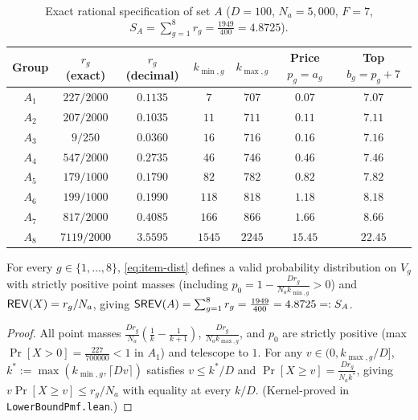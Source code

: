 \begin{table}[h]
\centering\small
\begin{tabular}{ccccccc}
\toprule
Group & $r_g$ (exact) & $r_g$ (decimal) & $k_{\min,g}$ & $k_{\max,g}$ & Price $p_g = a_g$ & Top $b_g = p_g + 7$ \\
\midrule
$A_1$ & $227/2000$  & $0.1135$ & $7$    & $707$  & $0.07$  & $7.07$  \\
$A_2$ & $207/2000$  & $0.1035$ & $11$   & $711$  & $0.11$  & $7.11$  \\
$A_3$ & $9/250$     & $0.0360$ & $16$   & $716$  & $0.16$  & $7.16$  \\
$A_4$ & $547/2000$  & $0.2735$ & $46$   & $746$  & $0.46$  & $7.46$  \\
$A_5$ & $179/1000$  & $0.1790$ & $82$   & $782$  & $0.82$  & $7.82$  \\
$A_6$ & $199/1000$  & $0.1990$ & $118$  & $818$  & $1.18$  & $8.18$  \\
$A_7$ & $817/2000$  & $0.4085$ & $166$  & $866$  & $1.66$  & $8.66$  \\
$A_8$ & $7119/2000$ & $3.5595$ & $1545$ & $2245$ & $15.45$ & $22.45$ \\
\bottomrule
\end{tabular}
\caption{Exact rational specification of set $A$ ($D = 100$, $N_a = 5{,}000$, $F = 7$, $S_A = \sum_{g=1}^8 r_g = \frac{1949}{400} = 4.8725$).}
\label{tab:groups}
\end{table}

\begin{lemma}\label{lem:srev-a}
For every $g \in \{1,\dots,8\}$, \eqref{eq:item-dist} defines a valid probability distribution on $V_g$ with strictly positive point masses (including $p_0 = 1 - \frac{D r_g}{N_a k_{\min,g}} > 0$) and $\mathsf{REV}(X) = r_g/N_a$, giving $\mathsf{SREV}(A) = \sum_{g=1}^8 r_g = \frac{1949}{400} = 4.8725 =: S_A$.
\end{lemma}

\begin{proof}
All point masses $\frac{D r_g}{N_a}(\frac{1}{k}-\frac{1}{k+1})$, $\frac{D r_g}{N_a k_{\max,g}}$, and $p_0$ are strictly positive (max $\Pr[X>0] = \frac{227}{700000} < 1$ in $A_1$) and telescope to $1$. For any $v \in (0, k_{\max,g}/D]$, $k^* := \max(k_{\min,g}, \lceil Dv\rceil)$ satisfies $v \le k^*/D$ and $\Pr[X \ge v] = \frac{D r_g}{N_a k^*}$, giving $v\Pr[X \ge v] \le r_g/N_a$ with equality at every $k/D$. (Kernel-proved in \texttt{LowerBoundPmf.lean}.)
\end{proof}

